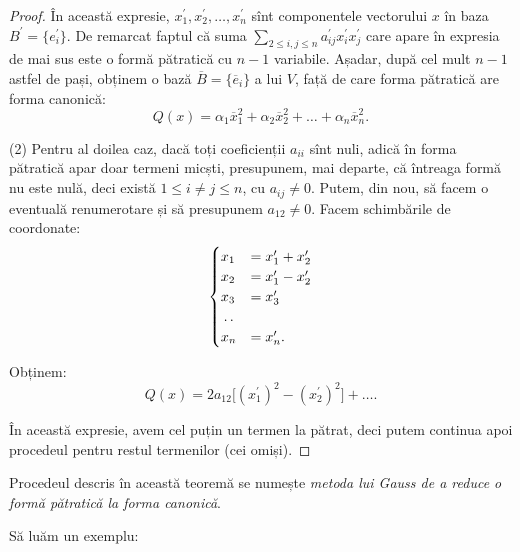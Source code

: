 \documentclass[11pt,a4paper]{article}
\theoremstyle{dotless}
\theoremstyle{dotlessdr}
\begin{document}
\begin{proof}
În această expresie, $x^{\prime}_1, x^{\prime}_2, \dots, x^{\prime}_n$ sînt
componentele vectorului $x$ în baza $B^{\prime} = \{e^{\prime}_i\}$. De remarcat
faptul că suma $\displaystyle\sum_{2 \leq i,j \leq n} a^{\prime}_{ij} 
x^{\prime}_i x^{\prime}_j$ care apare în expresia de mai sus este o formă 
pătratică cu $n - 1$ variabile. Așadar, după cel mult $n - 1$ astfel de pași,
obținem o bază $\overline{B} = \{\overline{e}_i \}$ a lui $V$, față de care
forma pătratică are forma canonică: 
 \[
	Q(x) = \alpha_1 \overline{x}_1^2 + \alpha_2 \overline{x}_2^2 + \dots
	            + \alpha_n \overline{x}_n^2.
\]

(2) Pentru al doilea caz, dacă toți coeficienții $a_{ii}$ sînt nuli, adică în 
forma pătratică apar doar termeni micști, presupunem, mai departe, că întreaga
formă nu este nulă, deci există $1 \leq i \neq j \leq n$, cu $a_{ij} \neq 0$.
Putem, din nou, să facem o eventuală renumerotare și să presupunem $a_{12} 
\neq 0$. Facem schimbările de coordonate: 
 \[
	\begin{cases}	
	    x_1 &= x^{\prime}_1 + x^{\prime}_2 \\
	    x_2 &= x^{\prime}_1 - x^{\prime}_2 \\
	    x_3 &= x^{\prime}_3 \\
	    \dotfill \\
	    x_n &= x^{\prime}_n. 
    \end{cases}
\]

Obținem: 
 \[
	Q(x) = 2a_{12} \Big[ (x^{\prime}_1)^2 - (x^{\prime}_2)^2 \Big] + \dots.
\]

În această expresie, avem cel puțin un termen la pătrat, deci putem continua
apoi procedeul pentru restul termenilor (cei omiși).
\end{proof}

Procedeul descris în această teoremă se numește \emph{metoda lui Gauss de a
reduce o formă pătratică la forma canonică}.

Să luăm un exemplu:
\end{document}
